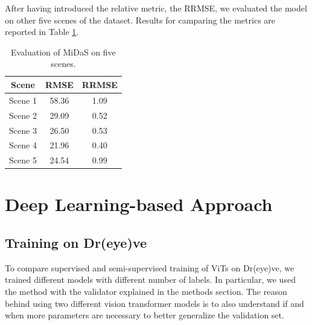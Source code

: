 After having introduced the relative metric, the RRMSE, we evaluated the model 
on other five scenes of the dataset. Results for camparing the metrics are reported in 
Table \ref{tab:mde_metrics}.
\begin{table}[h]
    \vspace{0.3cm}
    \centering
    \begin{tabular}{ccc}
    \hline
    \textbf{Scene} & \textbf{RMSE} & \textbf{RRMSE} \\ \hline\hline
    Scene 1 & 58.36 & 1.09 \\ \hline
    Scene 2 & 29.09 & 0.52 \\ \hline
    Scene 3 & 26.50 & 0.53 \\ \hline
    Scene 4 & 21.96 & 0.40 \\ \hline
    Scene 5 & 24.54 & 0.99 \\ \hline
    \end{tabular}
    \caption[MiDaS depth estimation evaluation on NuScenes dataset.]
    {Evaluation of MiDaS on five scenes.}
    \label{tab:mde_metrics}
\end{table}



\section {Deep Learning-based Approach}
\label{sec:exp_dl_approach}
\subsection{Training on Dr(eye)ve}
To compare supervised and semi-supervised training of ViTs on Dr(eye)ve, we 
trained different models with different number of labels. In particular, we 
used the method with the validator explained in the methods section.
The reason behind using two different vision transformer models is to also 
understand if and when more parameters are necessary to better generalize the 
validation set.

